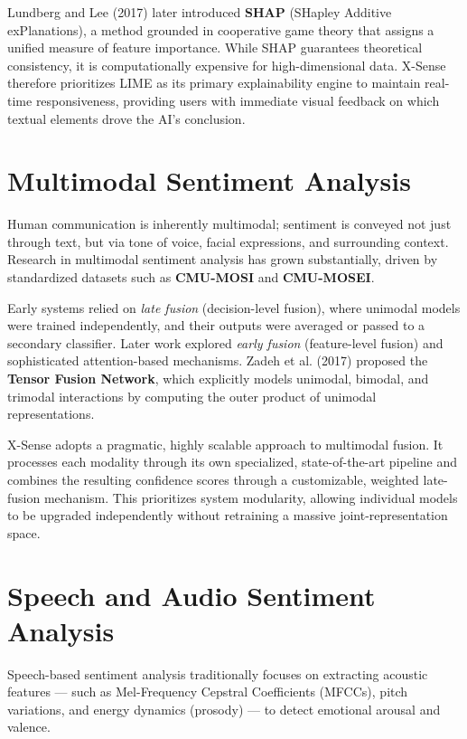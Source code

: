 \documentclass[12pt, a4paper]{report}
\begin{document}
Lundberg and Lee (2017) later introduced \textbf{SHAP} (SHapley Additive exPlanations), a method grounded in cooperative game theory that assigns a unified measure of feature importance. While SHAP guarantees theoretical consistency, it is computationally expensive for high-dimensional data. X-Sense therefore prioritizes LIME as its primary explainability engine to maintain real-time responsiveness, providing users with immediate visual feedback on which textual elements drove the AI's conclusion.

\section{Multimodal Sentiment Analysis}

Human communication is inherently multimodal; sentiment is conveyed not just through text, but via tone of voice, facial expressions, and surrounding context. Research in multimodal sentiment analysis has grown substantially, driven by standardized datasets such as \textbf{CMU-MOSI} and \textbf{CMU-MOSEI}. 

Early systems relied on \textit{late fusion} (decision-level fusion), where unimodal models were trained independently, and their outputs were averaged or passed to a secondary classifier. Later work explored \textit{early fusion} (feature-level fusion) and sophisticated attention-based mechanisms. Zadeh et al. (2017) proposed the \textbf{Tensor Fusion Network}, which explicitly models unimodal, bimodal, and trimodal interactions by computing the outer product of unimodal representations.

X-Sense adopts a pragmatic, highly scalable approach to multimodal fusion. It processes each modality through its own specialized, state-of-the-art pipeline and combines the resulting confidence scores through a customizable, weighted late-fusion mechanism. This prioritizes system modularity, allowing individual models to be upgraded independently without retraining a massive joint-representation space.

\section{Speech and Audio Sentiment Analysis}

Speech-based sentiment analysis traditionally focuses on extracting acoustic features --- such as Mel-Frequency Cepstral Coefficients (MFCCs), pitch variations, and energy dynamics (prosody) --- to detect emotional arousal and valence. 
\end{document}
